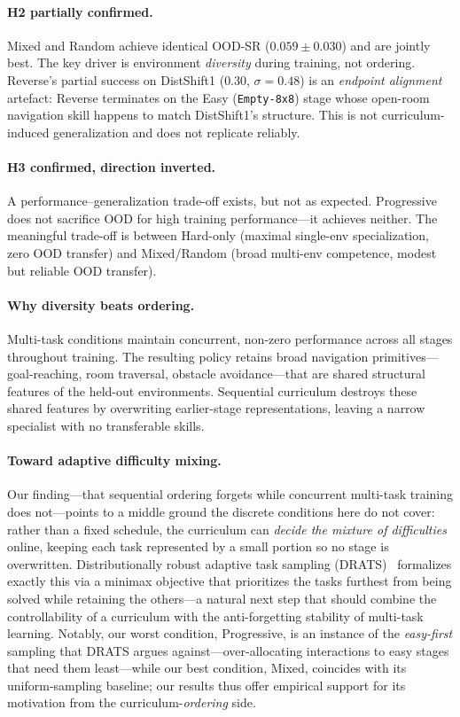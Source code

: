 \documentclass{article}
\begin{document}
\paragraph{H2 partially confirmed.}
Mixed and Random achieve identical OOD-SR ($0.059\pm0.030$) and are jointly best.
The key driver is environment \emph{diversity} during training, not ordering.
Reverse's partial success on DistShift1 ($0.30$, $\sigma=0.48$) is an \emph{endpoint alignment} artefact:
Reverse terminates on the Easy (\texttt{Empty-8x8}) stage whose open-room navigation skill
happens to match DistShift1's structure.
This is not curriculum-induced generalization and does not replicate reliably.

\paragraph{H3 confirmed, direction inverted.}
A performance--generalization trade-off exists, but not as expected.
Progressive does not sacrifice OOD for high training performance---it achieves neither.
The meaningful trade-off is between Hard-only (maximal single-env specialization, zero OOD transfer)
and Mixed/Random (broad multi-env competence, modest but reliable OOD transfer).

\paragraph{Why diversity beats ordering.}
Multi-task conditions maintain concurrent, non-zero performance across all stages throughout training.
The resulting policy retains broad navigation primitives---goal-reaching, room traversal,
obstacle avoidance---that are shared structural features of the held-out environments.
Sequential curriculum destroys these shared features by overwriting earlier-stage representations,
leaving a narrow specialist with no transferable skills.

\paragraph{Toward adaptive difficulty mixing.}
Our finding---that sequential ordering forgets while concurrent multi-task training does
not---points to a middle ground the discrete conditions here do not cover: rather than a
fixed schedule, the curriculum can \emph{decide the mixture of difficulties} online, keeping
each task represented by a small portion so no stage is overwritten. Distributionally robust
adaptive task sampling (DRATS)~\citep{robust-multitask-arxiv26} formalizes exactly this via a
minimax objective that prioritizes the tasks furthest from being solved while retaining the
others---a natural next step that should combine the controllability of a curriculum with the
anti-forgetting stability of multi-task learning.
Notably, our worst condition, Progressive, is an instance of the \emph{easy-first} sampling
that DRATS argues against---over-allocating interactions to easy stages that need them least---while
our best condition, Mixed, coincides with its uniform-sampling baseline; our results thus offer
empirical support for its motivation from the curriculum-\emph{ordering} side.
\end{document}
